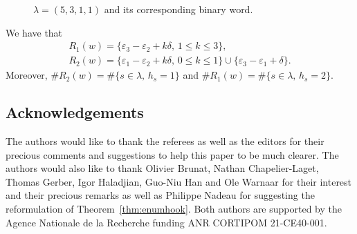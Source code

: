 \documentclass[pdftex]{sigma}
\numberwithin{equation}{section}
\begin{document}
\begin{Example}
\begin{figure}[th]
\caption{$\lambda=(5,3,1,1)$ and its corresponding binary word.}\label{fig:word111}
\end{figure}

We have that
\begin{gather*}
R_1(w)=\lbrace \varepsilon_3-\varepsilon_2+k\delta,\, 1\leq k\leq 3\rbrace,\\
R_2(w)=\lbrace \varepsilon_1-\varepsilon_2+k\delta,\, 0\leq k\leq 1\rbrace\cup \lbrace \varepsilon_3-\varepsilon_1+\delta\rbrace.
\end{gather*}
Moreover, $\#R_2(w)=\#\lbrace s\in\lambda,\, h_s=1\rbrace$ and $\#R_1(w)=\#\lbrace s\in\lambda,\, h_s=2\rbrace$.
\end{Example}

\subsection*{Acknowledgements}
The authors would like to thank the referees as well as the editors for their precious comments and suggestions to help this paper to be much clearer.
The authors would also like to thank Olivier Brunat, Nathan Chapelier-Laget, Thomas Gerber, Igor Haladjian, Guo-Niu Han and Ole Warnaar for their interest and their precious remarks as well as Philippe Nadeau for suggesting the reformulation of Theorem~\ref{thm:enumhook}.
Both authors are supported by the Agence Nationale de la Recherche funding ANR CORTIPOM 21-CE40-001.


%
%
\end{document}

